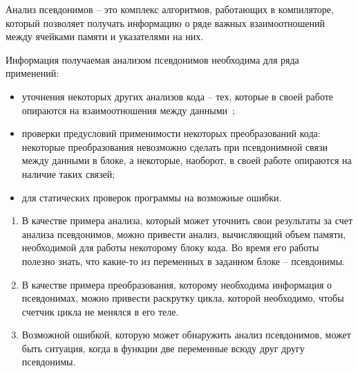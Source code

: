 





\Intro


\begin{mydefinition}
Анализ псевдонимов -- это комплекс алгоритмов, работающих в компиляторе, который позволяет получать информацию о ряде важных взаимоотношений между ячейками памяти и указателями на них.
\end{mydefinition}

Информация получаемая анализом псевдонимов необходима для ряда применений:
\begin{itemize}
\item уточнения некоторых других анализов кода -- тех, которые в своей работе опираются на взаимоотношения между данными~\autocite{Voevodin};
\item проверки предусловий применимости некоторых преобразований кода: некоторые преобразования невозможно сделать при псевдонимной связи между данными в блоке, а некоторые, наоборот, в своей работе опираются на наличие таких связей;
\item для статических проверок программы на возможные ошибки.
\end{itemize}

\begin{myexamples}
\begin{enumerate}
\item В качестве примера анализа, который может уточнить свои результаты за счет анализа псевдонимов, можно привести анализ, вычисляющий объем памяти, необходимой для работы некоторому блоку кода. Во время его работы полезно знать, что какие-то из переменных в заданном блоке -- псевдонимы.
\item В качестве примера преобразования, которому необходима информация о псевдонимах, можно привести раскрутку цикла, которой необходимо, чтобы счетчик цикла не менялся в его теле.
\item Возможной ошибкой, которую может обнаружить анализ псевдонимов, может быть ситуация, когда в функции две переменные всюду друг другу псевдонимы.
\end{enumerate}
\end{myexamples}

